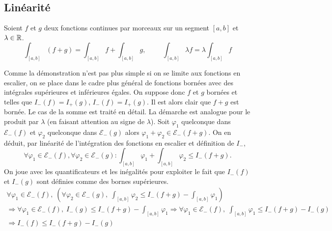\subsection{Linéarité}
\begin{propn}
 Soient $f$ et $g$ deux fonctions continues par morceaux sur un segment $[a,b]$ et $\lambda \in \mathbb{R}$.
\begin{displaymath}
 \int_{[a,b]}\left( f+g\right) = \int_{[a,b]} f + \int_{[a,b]}g, \hspace{1cm}
 \int_{[a,b]}\lambda f = \lambda \int_{[a,b]} f
\end{displaymath}
\end{propn}
\begin{demo}
Comme la démonstration n'est pas plus simple si on se limite aux fonctions en escalier, on se place dans le cadre plus général de fonctions bornées avec des intégrales supérieures et inférieures égales.\newline
On suppose donc $f$ et $g$ bornées et telles que $I_-(f) = I_+(g)$, $I_-(f) = I_+(g)$. Il est alors clair que $f+g$ est bornée.\newline 
Le cas de la somme est traité en détail. La démarche est analogue pour le produit par $\lambda$ (en faisant attention au signe de $\lambda$).\newline
Soit $\varphi_1$ quelconque dans $\mathcal E_-(f)$ et $\varphi_2$ quelconque dans $\mathcal E_-(g)$ alors $\varphi_1 + \varphi_2 \in \mathcal E_-(f+g)$. On en déduit, par linéarité de l'intégration des fonctions en escalier et définition de $I_-$,
\begin{displaymath}
 \forall \varphi_1 \in \mathcal E_-(f), \forall \varphi_2 \in \mathcal E_-(g) :
\int_{[a,b]}\varphi_1 + \int_{[a,b]}\varphi_2 \leq I_-\left( f+g\right) . 
\end{displaymath} 
On joue avec les quantificateurs et les inégalités pour exploiter le fait que $I_-(f)$ et  $I_-(g)$ sont définies comme des bornes supérieures.
\begin{multline*}
 \forall \varphi_1 \in \mathcal E_-(f),\;\left( \forall \varphi_2 \in \mathcal E_-(g) ,\;
\int_{[a,b]}\varphi_2 \leq I_-\left( f+g\right) - \int_{[a,b]}\varphi_1 \right)  \\ 
\Rightarrow \forall \varphi_1 \in \mathcal E_-(f),\;  I_-(g) \leq I_-\left( f+g\right) - \int_{[a,b]}\varphi_1 
\Rightarrow \forall \varphi_1 \in \mathcal E_-(f),\; \int_{[a,b]}\varphi_1 \leq I_-\left( f+g\right) - I_-(g) \\
\Rightarrow I_-(f) \leq I_-\left( f+g\right) - I_-(g) 

\end{multline*}
\end{demo}
